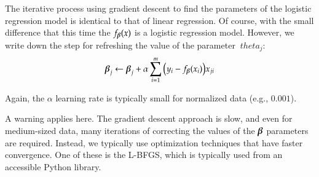 \begin{refsection}
The iterative process using gradient descent to find the parameters of the logistic regression model is identical to that of linear regression. Of course, with the small difference that this time the $ f_{\boldsymbol{\beta}}(x)$ is a logistic regression model. However, we write down the step for refreshing the value of the parameter $ \ theta_j $:
\begin{equation}
  \boldsymbol{\beta}_j\leftarrow\boldsymbol{\beta}_j+\alpha\sum_{i=1}^{m}\big(y_i-f_{\boldsymbol{\beta}}(x_i)\big) x_{ji}
\end{equation}

Again, the $\alpha$ learning rate is typically small for normalized data (e.g., $0.001$).

A warning applies here. The gradient descent approach is slow, and even for medium-sized data, many iterations of correcting the values of the $\boldsymbol{\beta}$ parameters are required. Instead, we typically use optimization techniques that have faster convergence. One of these is the L-BFGS, which is typically used from an accessible Python library.

\printbibliography[heading=subbibliography]
\end{refsection}